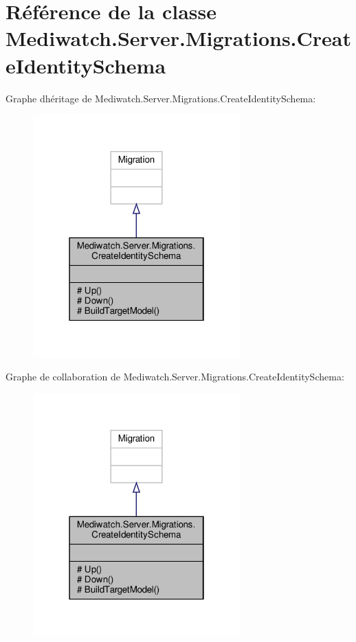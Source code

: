 \hypertarget{class_mediwatch_1_1_server_1_1_migrations_1_1_create_identity_schema}{}\section{Référence de la classe Mediwatch.\+Server.\+Migrations.\+Create\+Identity\+Schema}
\label{class_mediwatch_1_1_server_1_1_migrations_1_1_create_identity_schema}


Graphe d\textquotesingle{}héritage de Mediwatch.\+Server.\+Migrations.\+Create\+Identity\+Schema\+:\nopagebreak
\begin{figure}[H]
\begin{center}
\leavevmode
\includegraphics[width=226pt]{class_mediwatch_1_1_server_1_1_migrations_1_1_create_identity_schema__inherit__graph}
\end{center}
\end{figure}


Graphe de collaboration de Mediwatch.\+Server.\+Migrations.\+Create\+Identity\+Schema\+:\nopagebreak
\begin{figure}[H]
\begin{center}
\leavevmode
\includegraphics[width=226pt]{class_mediwatch_1_1_server_1_1_migrations_1_1_create_identity_schema__coll__graph}
\end{center}
\end{figure}
